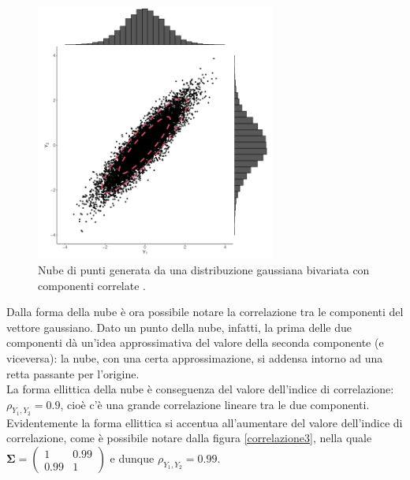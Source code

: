 \begin{figure}[h]
    \centering
    \includegraphics[width=0.7\textwidth]{images/Gaussiane/VettoreBivariatoIndipendenza2.png}
    \caption{Nube di punti generata da una distribuzione gaussiana bivariata con componenti correlate \cite{wilkinson_introduction_2020}.}
    \label{correlazione2}
\end{figure}

Dalla forma della nube è ora possibile notare la correlazione tra le componenti del vettore gaussiano. Dato un punto della nube, infatti, la prima delle due componenti dà un'idea approssimativa del valore della seconda componente (e viceversa): la nube, con una certa approssimazione, si addensa intorno ad una retta passante per l'origine.\\
La forma ellittica della nube è conseguenza del valore dell'indice di correlazione: $\rho_{Y_1,Y_2}=0.9$, cioè c'è una grande correlazione lineare tra le due componenti.\\

\newpage
Evidentemente la forma ellittica si accentua all'aumentare del valore dell'indice di correlazione, come è possibile notare dalla figura \ref{correlazione3}, nella quale $\mathbf{\Sigma}=\begin{pmatrix}1&0.99\\0.99&1\end{pmatrix}$ e dunque $\rho_{Y_1,Y_2}=0.99$.

